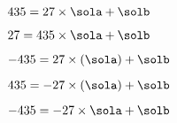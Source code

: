 $435=27\times\sola+\solb$

$27=435\times\sola+\solb$

$-435=27\times(\sola)+\solb$

$435=-27\times(\sola)+\solb$

$-435=-27\times\sola+\solb$
